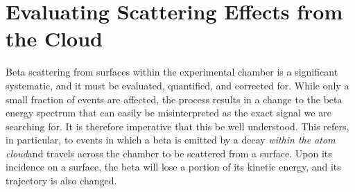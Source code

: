 


\FloatBarrier
\section{Evaluating Scattering Effects from the Cloud}
\label{sec:bs}
%
%
	Beta scattering from surfaces within the experimental chamber is a significant systematic, and it must be evaluated, quantified, and corrected for.  While only a small fraction of events are affected, the process results in a change to the beta energy spectrum that can easily be misinterpreted as the exact signal we are searching for.  It is therefore imperative that this be well understood. 
This refers, in particular, to events in which a beta is emitted by a decay \emph{within the atom cloud}and travels across the chamber to be scattered from a surface.  Upon its incidence on a surface, the beta will lose a portion of its kinetic energy, and its trajectory is also changed.  


